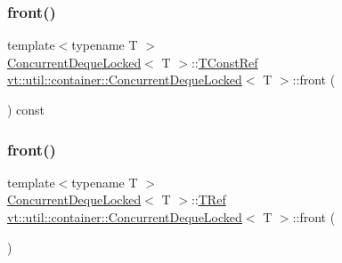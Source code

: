 \subsubsection{\texorpdfstring{front()}{front()}\hspace{0.1cm}{\footnotesize\ttfamily [1/2]}}
{\footnotesize\ttfamily template$<$typename T $>$ \\
\hyperlink{structvt_1_1util_1_1container_1_1_concurrent_deque_locked}{Concurrent\+Deque\+Locked}$<$ T $>$\+::\hyperlink{structvt_1_1util_1_1container_1_1_concurrent_deque_locked_a9da9776dff836c013a95431f3ab15e35}{T\+Const\+Ref} \hyperlink{structvt_1_1util_1_1container_1_1_concurrent_deque_locked}{vt\+::util\+::container\+::\+Concurrent\+Deque\+Locked}$<$ T $>$\+::front (\begin{DoxyParamCaption}{ }\end{DoxyParamCaption}) const}

\mbox{\label{structvt_1_1util_1_1container_1_1_concurrent_deque_locked_a036bb79b4122e2d79f62c61a7715f374}} 
\subsubsection{\texorpdfstring{front()}{front()}\hspace{0.1cm}{\footnotesize\ttfamily [2/2]}}
{\footnotesize\ttfamily template$<$typename T $>$ \\
\hyperlink{structvt_1_1util_1_1container_1_1_concurrent_deque_locked}{Concurrent\+Deque\+Locked}$<$ T $>$\+::\hyperlink{structvt_1_1util_1_1container_1_1_concurrent_deque_locked_a4451b0e7f6c8aa741f98a77a9fed353e}{T\+Ref} \hyperlink{structvt_1_1util_1_1container_1_1_concurrent_deque_locked}{vt\+::util\+::container\+::\+Concurrent\+Deque\+Locked}$<$ T $>$\+::front (\begin{DoxyParamCaption}{ }\end{DoxyParamCaption})}

\mbox{\label{structvt_1_1util_1_1container_1_1_concurrent_deque_locked_ab9f6f815492221e1e159f310276b9e0b}} 
